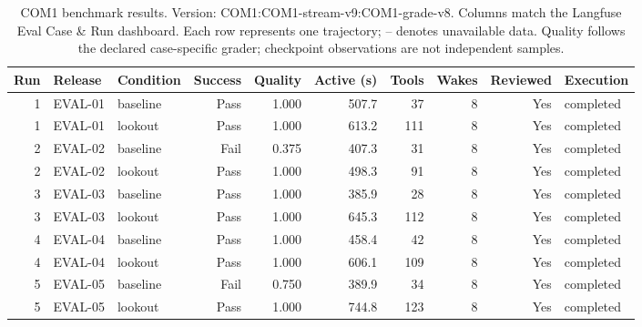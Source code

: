 \begin{table}[t]
\centering\scriptsize
\begin{tabular}{@{}rllrrrrrrl@{}}
\toprule
Run & Release & Condition & Success & Quality & Active (s) & Tools & Wakes & Reviewed & Execution \\
\midrule
1 & EVAL-01 & baseline & Pass & 1.000 & 507.7 & 37 & 8 & Yes & completed \\
1 & EVAL-01 & lookout & Pass & 1.000 & 613.2 & 111 & 8 & Yes & completed \\
2 & EVAL-02 & baseline & Fail & 0.375 & 407.3 & 31 & 8 & Yes & completed \\
2 & EVAL-02 & lookout & Pass & 1.000 & 498.3 & 91 & 8 & Yes & completed \\
3 & EVAL-03 & baseline & Pass & 1.000 & 385.9 & 28 & 8 & Yes & completed \\
3 & EVAL-03 & lookout & Pass & 1.000 & 645.3 & 112 & 8 & Yes & completed \\
4 & EVAL-04 & baseline & Pass & 1.000 & 458.4 & 42 & 8 & Yes & completed \\
4 & EVAL-04 & lookout & Pass & 1.000 & 606.1 & 109 & 8 & Yes & completed \\
5 & EVAL-05 & baseline & Fail & 0.750 & 389.9 & 34 & 8 & Yes & completed \\
5 & EVAL-05 & lookout & Pass & 1.000 & 744.8 & 123 & 8 & Yes & completed \\
\bottomrule
\end{tabular}
\caption{COM1 benchmark results. Version: COM1:COM1-stream-v9:COM1-grade-v8. Columns match the Langfuse Eval Case \& Run dashboard. Each row represents one trajectory; -- denotes unavailable data. Quality follows the declared case-specific grader; checkpoint observations are not independent samples.}
\label{tab:com-results-1}
\end{table}

